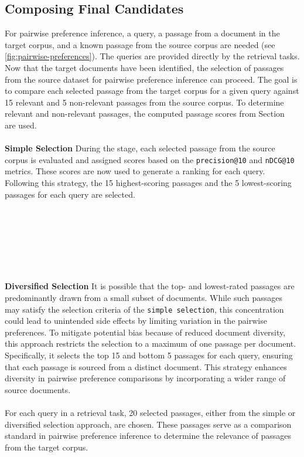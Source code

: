 \subsection{Composing Final Candidates}\label{composing-final-candidates}

For pairwise preference inference, a query, a passage from a document in the target corpus, and a known passage from the source corpus are needed (see \ref{fig:pairwise-preferences}). The queries are provided directly by the retrieval tasks. Now that the target documents have been identified, the selection of passages from the source dataset for pairwise preference inference can proceed. The goal is to compare each selected passage from the target corpus for a given query against 15 relevant and 5 non-relevant passages from the source corpus. To determine relevant and non-relevant passages, the computed passage scores from Section~ are used.
\\\\
\textbf{Simple Selection} During the  stage, each selected passage from the source corpus is evaluated and assigned scores based on the \texttt{precision@10} and \texttt{nDCG@10} metrics. These scores are now used to generate a ranking for each query. Following this strategy, the 15 highest-scoring passages and the 5 lowest-scoring passages for each query are selected.
\\\\\\\\\\\\\\\\
\textbf{Diversified Selection} It is possible that the top- and lowest-rated passages are predominantly drawn from a small subset of documents. While such passages may satisfy the selection criteria of the \texttt{simple selection}, this concentration could lead to unintended side effects by limiting variation in the pairwise preferences. To mitigate potential bias because of reduced document diversity, this approach restricts the selection to a maximum of one passage per document. Specifically, it selects the top 15 and bottom 5 passages for each query, ensuring that each passage is sourced from a distinct document. This strategy enhances diversity in pairwise preference comparisons by incorporating a wider range of source documents.
\\\\
For each query in a retrieval task, 20 selected passages, either from the simple or diversified selection approach, are chosen. These passages serve as a comparison standard in pairwise preference inference to determine the relevance of passages from the target corpus.
\pagebreak

